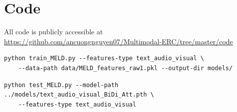 \section{Code}
All code is publicly accessible at \url{https://github.com/ancuongnguyen07/Multimodal-ERC/tree/master/code}

\begin{lstlisting}[label={lst:training-script},caption=Running the training script.]
python train_MELD.py --features-type text_audio_visual \
    --data-path data/MELD_features_raw1.pkl --output-dir models/
\end{lstlisting}

\begin{lstlisting}[label={lst:testing-script},caption=Running the testing script.]
python test_MELD.py --model-path ../models/text_audio_visual_BiDi_Att.pth \
    --features-type text_audio_visual
\end{lstlisting}

